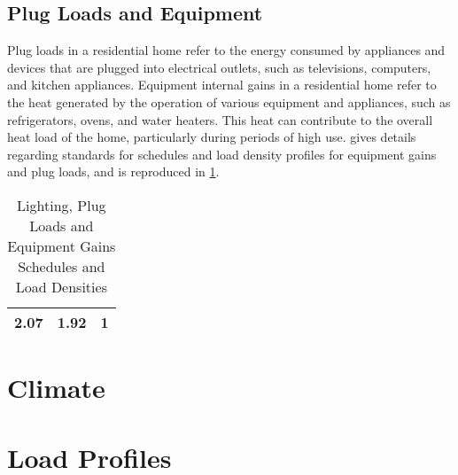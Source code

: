 \subsection{Plug Loads and Equipment}
Plug loads in a residential home refer to the energy consumed by appliances and devices that are plugged into electrical outlets, such as televisions, computers, and kitchen appliances. Equipment internal gains in a residential home refer to the heat generated by the operation of various equipment and appliances, such as refrigerators, ovens, and water heaters. This heat can contribute to the overall heat load of the home, particularly during periods of high use.  gives details regarding standards for schedules and load density profiles for equipment gains and plug loads, and is reproduced in \cref{tbl:lightandequip}.

\begin{table}[htb]
    \centering
    \caption{Lighting, Plug Loads and Equipment Gains Schedules and Load Densities \cite{ISO17772}}
    \label{tbl:lightandequip}
    \begin{tabular}
        {lcr}
        \toprule
        2.07&1.92   &1\\
        \bottomrule
    \end{tabular}
\end{table}

\section{Climate}


\section{Load Profiles}